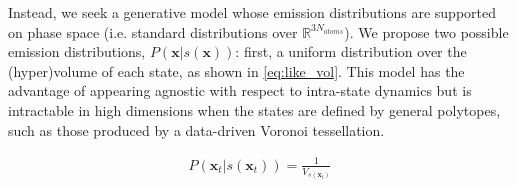 \documentclass[journal=jpcbfk, layout=twocolumn, manuscript=article]{achemso}
\begin{document}
Instead, we seek a generative model whose emission distributions are supported on phase space (i.e. standard distributions over $\mathbb{R}^{3N_{atoms}}$). We propose two possible emission distributions, $P(\mathbf{x} | s(\mathbf{x}))$: first, a uniform distribution over the (hyper)volume of each state, as shown in \cref{eq:like_vol}. This model has the advantage of appearing agnostic with respect to intra-state dynamics but is intractable in high dimensions when the states are defined by general polytopes, such as those produced by a data-driven Voronoi tessellation. 
 

 
\begin{equation}
\label{eq:like_vol}
\begin{split}
 P(\mathbf{x}_t | s(\mathbf{x}_t)) = \frac{1}{V_{s(\mathbf{x}_{t})}}
\end{split}
\end{equation} 
\end{document}
